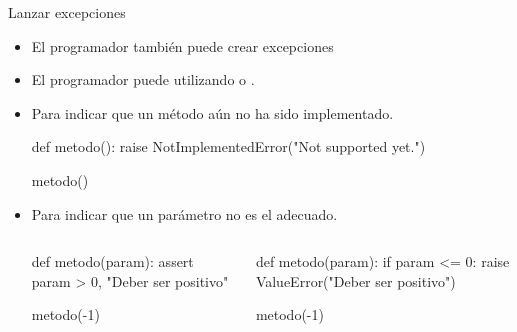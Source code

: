 \documentclass[10pt, envcountsect , spanish]{beamer}
\begin{document}
\begin{frame}[fragile]{Lanzar excepciones} 

\begin{itemize}
\item El programador también puede crear excepciones

\item El programador puede  utilizando  o  .

\item[]\unEjemplo Para indicar que un método aún no ha sido implementado.

\begin{pyconsole}[][frame=single, fontsize=\scriptsize]
def metodo():
    raise NotImplementedError("Not supported yet.")

metodo()

\end{pyconsole}

\item[]\unEjemplo Para indicar que un parámetro no es el adecuado.

\begin{columns}
\begin{column}{.48\textwidth}
\begin{pyconsole}[][frame=single, fontsize=\tiny]
def metodo(param):
 assert param > 0, "Deber ser positivo"

metodo(-1)

\end{pyconsole}
\end{column}

\begin{column}{.48\textwidth}
\begin{pyconsole}[][frame=single, fontsize=\tiny]
def metodo(param):
 if param <= 0:
  raise ValueError("Deber ser positivo")

metodo(-1)

\end{pyconsole}
\end{column}
\end{columns}

\end{itemize}
\end{frame}
\end{document}
